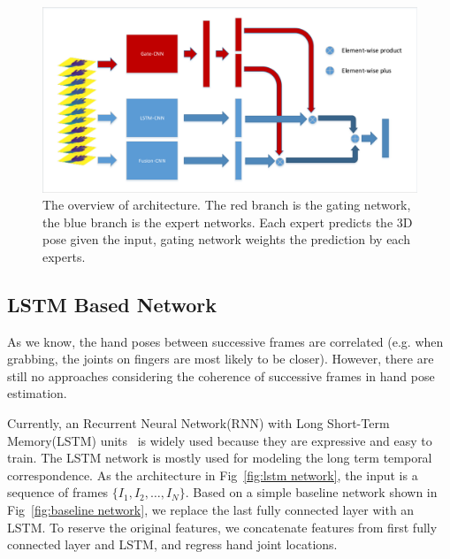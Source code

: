 \documentclass[journal,comsoc]{IEEEtran}
\let\MYoriglatexcaption\caption
\renewcommand{\caption}[2][\relax]{\MYoriglatexcaption[#2]{#2}}
\begin{document}
\begin{figure}[t]
    \centering
    \includegraphics[width=1\linewidth]{src/network/architecture.pdf}
    \caption{The overview of architecture. The red branch is the gating network, the blue branch is the expert networks.
    Each expert predicts the 3D pose given the input, gating network weights the prediction by each experts.}
\label{fig:architecture}
\end{figure}

\subsection{LSTM Based Network}\label{sec:lstm netowork}
As we know, the hand poses between successive frames are correlated (e.g. when grabbing, the joints on fingers are most likely
to be closer). However, there are still no approaches considering the coherence of successive frames in hand pose estimation.

Currently, an Recurrent Neural Network(RNN) with Long Short-Term Memory(LSTM) units~\cite{zaremba2014learning} is widely used
because they are expressive and easy to train. The LSTM network is mostly used for modeling the long term temporal correspondence.
As the architecture in Fig~\ref{fig:lstm network}, the input is a sequence of frames $\{I_1, I_2, \dots, I_N\}$.
Based on a simple baseline network shown in Fig~\ref{fig:baseline network}, we replace the last fully connected layer with an LSTM.
To reserve the original features, we concatenate features from first fully connected layer and LSTM, and regress hand joint locations.
\end{document}
